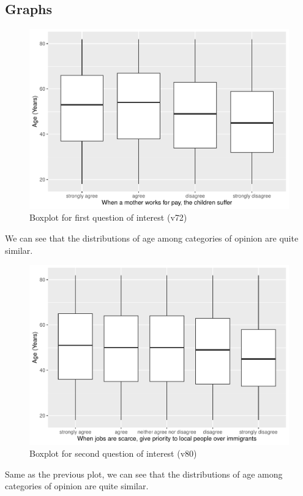 \documentclass[
]{article}
\begin{document}
\hypertarget{graphs}{%
\subsection{Graphs}\label{graphs}}

\begin{figure}

{\centering \includegraphics[width=0.65\linewidth]{Report-for-policy-makers_files/figure-latex/plot_v72-1} 

}

\caption{Boxplot for first question of interest (v72)}\label{fig:plot_v72}
\end{figure}

We can see that the distributions of age among categories of opinion are
quite similar.\\

\begin{figure}

{\centering \includegraphics[width=0.65\linewidth]{Report-for-policy-makers_files/figure-latex/plot_v80-1} 

}

\caption{Boxplot for second question of interest (v80)}\label{fig:plot_v80}
\end{figure}

Same as the previous plot, we can see that the distributions of age
among categories of opinion are quite similar.
\end{document}
